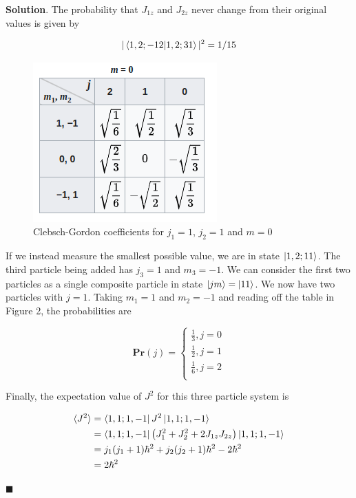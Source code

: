 \documentclass[12pt]{article}
\theoremstyle{definition}
\newenvironment{s}{%
        \begin{trivlist} \item \textbf{Solution}. }{%
            \hspace*{\fill} $\blacksquare$\end{trivlist}}%
\begin{document}
{\begin{s}
The probability that $J_{1z}$ and $J_{2z}$ never change from their original values is given by 

\begin{align*}
|\bra{1,2;-12}\ket{1,2;31}|^{2} = 1/15
\end{align*}

\begin{figure}
\centering
\includegraphics[scale=0.75]{cb-table-2.png}
\caption{Clebsch-Gordon coefficients for $j_{1} = 1$, $j_{2} = 1$ and $m=0$}
\end{figure}

If we instead measure the smallest possible value, we are in state $\ket{1,2;11}$. The third particle being added has $j_{3} = 1$ and $m_{3} = -1$. We can consider the first two particles as a single composite particle in state $\ket{jm} = \ket{11}$. We now have two particles with $j = 1$. Taking $m_{1} = 1$ and $m_{2} = -1$ and reading off the table in Figure 2, the probabilities are

$$
\mathbf{Pr}(j)=
\begin{cases}
\frac{1}{3}, j = 0 \\
\frac{1}{2}, j = 1 \\
\frac{1}{6}, j = 2 \\
\end{cases}
$$

Finally, the expectation value of $J^{2}$ for this three particle system is 

\begin{align*}
\langle J^{2} \rangle &= \bra{1,1;1,-1}J^{2}\ket{1,1;1,-1}\\
&= \bra{1,1;1,-1}\left(J_{1}^{2}+J_{2}^{2} + 2J_{1z}J_{2z}\right)\ket{1,1;1,-1}\\
&= j_{1}(j_{1}+1)\hbar^{2} + j_{2}(j_{2}+1)\hbar^{2} - 2\hbar^{2}\\
&= 2\hbar^{2}
\end{align*}

\end{s}
\end{document}
